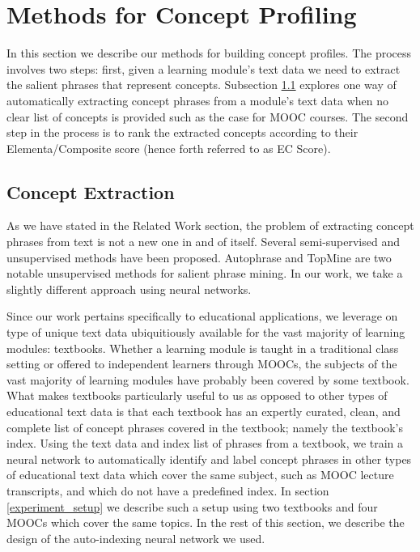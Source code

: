 \section{Methods for Concept Profiling}

In this section we describe our methods for building concept profiles. The process involves two steps: first, given a learning module's text data we need to extract the salient phrases that represent concepts. Subsection \ref{extraction} explores one way of automatically extracting concept phrases from a module's text data when no clear list of concepts is provided such as the case for MOOC courses. The second step in the process is to rank the extracted concepts according to their Elementa/Composite score (hence forth referred to as EC Score).

\subsection{Concept Extraction}\label{extraction}



As we have stated in the Related Work section, the problem of extracting concept phrases from text is not a new one in and of itself. Several semi-supervised and unsupervised methods have been proposed. Autophrase \cite{} and TopMine \cite{} are two notable unsupervised methods for salient phrase mining. In our work, we take a slightly different approach using neural networks.

Since our work pertains specifically to educational applications, we leverage on type of unique text data ubiquitiously available for the vast majority of learning modules: textbooks. Whether a learning module is taught in a traditional class setting or offered to independent learners through MOOCs, the subjects of the vast majority of learning modules have probably been covered by some textbook. What makes textbooks particularly useful to us as opposed to other types of educational text data is that each textbook has an expertly curated, clean, and complete list of concept phrases covered in the textbook; namely the textbook's index. Using the text data and index list of phrases from a textbook, we train a neural network to automatically identify and label concept phrases in other types of educational text data which cover the same subject, such as MOOC lecture transcripts, and which do not have a predefined index. In section \ref{experiment_setup} we describe such a setup using two textbooks and four MOOCs which cover the same topics. In the rest of this section, we describe the design of the auto-indexing neural network we used.

